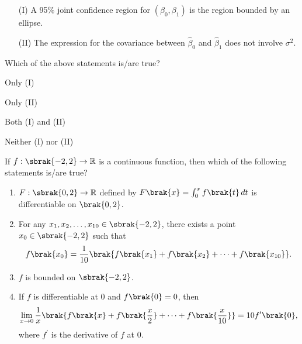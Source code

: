 \begin{enumerate}
    \item[(I)] A 95\% joint confidence region for $(\beta_0, \beta_1)$ is the region bounded by an ellipse.
    \item[(II)] The expression for the covariance between $\hat{\beta}_0$ and $\hat{\beta}_1$ does not involve $\sigma^2$.
\end{enumerate}

Which of the above statements is/are true?

\begin{enumerate}
\begin{multicols}{4}
    \item Only (I)
    \item Only (II)
    \item Both (I) and (II)
    \item Neither (I) nor (II)
    \end{multicols}
\end{enumerate}

\item If $f: \sbrak{-2, 2} \rightarrow \mathbb{R}$ is a continuous function, then which of the following statements 
is/are true?

\begin{enumerate}
    \item $F: \sbrak{0, 2} \rightarrow \mathbb{R} $ defined by $F\brak{x} = \int_{0}^{x} f\brak{t} \, dt$ is differentiable on $\brak{0, 2}$.
    
    \item For any $x_1, x_2, \dots, x_{10} \in \sbrak{-2, 2} $, there exists a point $x_{0} \in \sbrak{-2, 2}$ such that 
	    \begin{align}
    f\brak{x_{0}} = \frac{1}{10} \brak{ f\brak{x_1} + f\brak{x_2} + \dots + f\brak{x_{10}} }.
	    \end{align}
    
    \item $f$ is bounded on $\sbrak{-2, 2}$.
    
    \item If $f$ is differentiable at 0 and $f\brak{0} = 0$, then 
	    \begin{align}
    \lim_{x \to 0} \frac{1}{x} \brak{ f\brak{x} + f\brak{\frac{x}{2}} + \dots + f\brak{\frac{x}{10}} } = 10 f^\prime \brak{0},
	    \end{align}
    where $f^\prime$ is the derivative of $f$ at $0$.
\end{enumerate}



